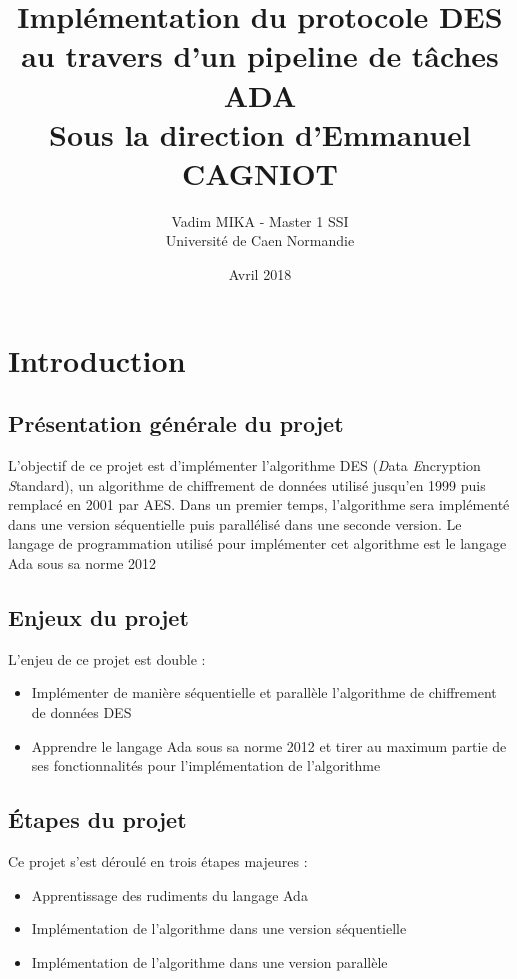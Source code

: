 \documentclass[a4paper]{article}
\title{Implémentation du protocole DES au travers d'un
pipeline de tâches ADA\\ \small{Sous la direction d'Emmanuel CAGNIOT}}
\author{Vadim MIKA - Master 1 SSI \\Université de Caen Normandie}
\date{Avril 2018}
\begin{document}
\maketitle

\newpage

\tableofcontents

\newpage


\section{Introduction}

\subsection{Présentation générale du projet}
L'objectif de ce projet est d'implémenter l'algorithme DES (\emph{D}ata \emph{E}ncryption \emph{S}tandard), un algorithme de chiffrement de données utilisé jusqu'en 1999 puis remplacé en 2001 par AES. Dans un premier temps, l'algorithme sera implémenté dans une version séquentielle puis parallélisé dans une seconde version.
\smallbreak
Le langage de programmation utilisé pour implémenter cet algorithme est le langage Ada sous sa norme 2012

\subsection{Enjeux du projet}
L'enjeu de ce projet est double :
\begin{itemize}
\item Implémenter de manière séquentielle et parallèle l'algorithme de chiffrement de données DES
\item Apprendre le langage Ada sous sa norme 2012 et tirer au maximum partie de ses fonctionnalités pour l'implémentation de l'algorithme
\end{itemize}

\subsection{Étapes du projet}
Ce projet s'est déroulé en trois étapes majeures : 
\begin{itemize}
\item Apprentissage des rudiments du langage Ada
\item Implémentation de l'algorithme dans une version séquentielle
\item Implémentation de l'algorithme dans une version parallèle
\end{itemize}
\end{document}

